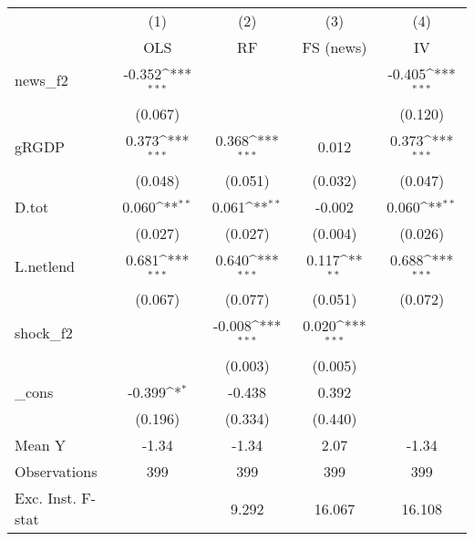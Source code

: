 {
\def\sym#1{\ifmmode^{#1}\else\(^{#1}\)\fi}
\begin{tabular}{l*{4}{c}}
\toprule
            &\multicolumn{1}{c}{(1)}&\multicolumn{1}{c}{(2)}&\multicolumn{1}{c}{(3)}&\multicolumn{1}{c}{(4)}\\
            &\multicolumn{1}{c}{OLS}&\multicolumn{1}{c}{RF}&\multicolumn{1}{c}{FS (news)}&\multicolumn{1}{c}{IV}\\
\midrule
news\_f2     &      -0.352\sym{***}&                     &                     &      -0.405\sym{***}\\
            &     (0.067)         &                     &                     &     (0.120)         \\
\addlinespace
gRGDP       &       0.373\sym{***}&       0.368\sym{***}&       0.012         &       0.373\sym{***}\\
            &     (0.048)         &     (0.051)         &     (0.032)         &     (0.047)         \\
\addlinespace
D.tot       &       0.060\sym{**} &       0.061\sym{**} &      -0.002         &       0.060\sym{**} \\
            &     (0.027)         &     (0.027)         &     (0.004)         &     (0.026)         \\
\addlinespace
L.netlend   &       0.681\sym{***}&       0.640\sym{***}&       0.117\sym{**} &       0.688\sym{***}\\
            &     (0.067)         &     (0.077)         &     (0.051)         &     (0.072)         \\
\addlinespace
shock\_f2    &                     &      -0.008\sym{***}&       0.020\sym{***}&                     \\
            &                     &     (0.003)         &     (0.005)         &                     \\
\addlinespace
\_cons      &      -0.399\sym{*}  &      -0.438         &       0.392         &                     \\
            &     (0.196)         &     (0.334)         &     (0.440)         &                     \\
\midrule
Mean Y      &       -1.34         &       -1.34         &        2.07         &       -1.34         \\
Observations&         399         &         399         &         399         &         399         \\
Exc. Inst. F-stat&                     &       9.292         &      16.067         &      16.108         \\
\bottomrule
\end{tabular}
}
